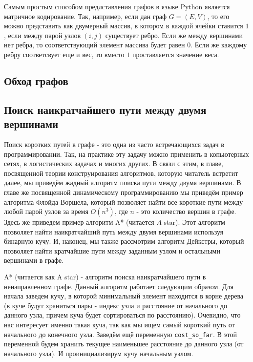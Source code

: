 Самым простым способом предлставления графов в языке 
Python является матричное кодирование. Так, например,
если дан граф $G=(E, V)$, то его можно представить как
двумерный массив, в котором в каждой ячейки ставится 
$1$, если между парой узлов $(i, j)$ существует ребро.
Если же между вершинами нет ребра, то соответствующий 
элемент массива будет равен $0$. Если же каждому ребру 
соответсвует еще и вес, то вместо $1$ проставляется
значение веса.

\subsection{Обход графов}

\subsection{Поиск наикратчайшего пути между двумя вершинами}

Поиск коротких путей в графе - это одна из часто встречающихся 
задач в программировании. Так, на практике эту задачу можно применить 
в копьютерных сетях, в логистических задачах и многих других.
В связи с этим, в главе, посвященной теории конструирования алгоритмов, 
которую читатель встретит далее, мы приведём 
жадный алгоритм поиска пути между двумя вершинами. 
В главе же посвященной динамическому программированию
мы приведём пример алгоритма Флойда-Воршела, который 
позволяет найти все короткие пути между любой парой 
узлов за время $O(n^3)$, где $n$ - это количество 
вершин в графе. Здесь же приведем пример 
алгоритм A* (читается $A$ star). Этот алгоритм позволяет 
найти наикратчайший путь между двумя вершинами 
используя бинарную кучу. И, наконец, мы также 
рассмотрим алгоритм Дейкстры, который позволяет 
найти кратчайшие пути между заданным узлом и 
остальными вершинами в графе. 


A* (читается как A star) - алгоритм поиска наикратчайшего 
пути в ненаправленном графе. Данный алгоритм работает 
следующим образом. Для начала заведем кучу, в которой минимальный элемент находится в 
корне дерева (в куче будут храниться пары - индекс узла и 
расстояние от начального до данного узла, причем куча будет 
сортироваться по расстоянию). Очевидно, что нас интересует 
именно такая куча, так как мы ищем самый короткий 
путь от начального до конечного узла. Заведём ещё 
переменную \texttt{cost\_so\_far}. В этой переменной будем 
хранить текущее наименьшее расстояние до данного узла 
(от начального узла). И проинициализирум кучу 
начальным узлом.

